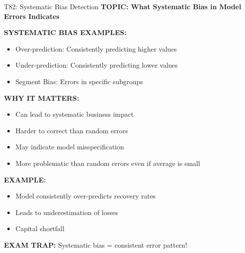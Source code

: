 \documentclass[8pt]{beamer}
\begin{document}
	\begin{frame}{T82: Systematic Bias Detection}
		\fontsize{6.5}{7.5}\selectfont
		\textbf{TOPIC: What Systematic Bias in Model Errors Indicates}
		
		\vspace{0.1cm}
		\textbf{SYSTEMATIC BIAS EXAMPLES:}
		\begin{itemize}
			\item \textcolor{myblue}{Over-prediction:} Consistently predicting higher values
			\item \textcolor{myblue}{Under-prediction:} Consistently predicting lower values
			\item \textcolor{myblue}{Segment Bias:} Errors in specific subgroups
		\end{itemize}
		
		\vspace{0.1cm}
		\textbf{WHY IT MATTERS:}
		\begin{itemize}
			\item Can lead to systematic business impact
			\item Harder to correct than random errors
			\item May indicate model misspecification
			\item More problematic than random errors even if average is small
		\end{itemize}
		
		\vspace{0.1cm}
		\textbf{EXAMPLE:}
		\begin{itemize}
			\item Model consistently over-predicts recovery rates
			\item Leads to underestimation of losses
			\item Capital shortfall
		\end{itemize}
		
		\textcolor{myred}{\textbf{EXAM TRAP:}} Systematic bias = \textcolor{myblue}{consistent error pattern}!
	\end{frame}
	
\end{document}

